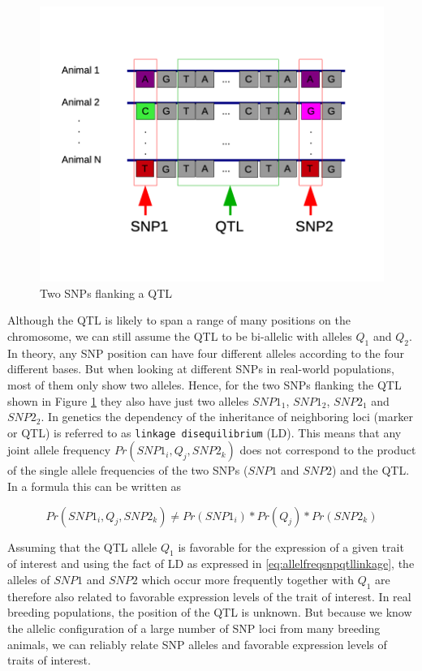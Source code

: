 \documentclass[
]{book}
\theoremstyle{definition}
\theoremstyle{definition}
\theoremstyle{definition}
\theoremstyle{remark}
\begin{document}
\begin{figure}
\includegraphics[width=12.22in]{odg/linkagesnpqtl} \caption{Two SNPs flanking a QTL}\label{fig:linkagesnpqtl}
\end{figure}

Although the QTL is likely to span a range of many positions on the chromosome, we can still assume the QTL to be bi-allelic with alleles \(Q_1\) and \(Q_2\). In theory, any SNP position can have four different alleles according to the four different bases. But when looking at different SNPs in real-world populations, most of them only show two alleles. Hence, for the two SNPs flanking the QTL shown in Figure \ref{fig:linkagesnpqtl} they also have just two alleles \(SNP1_1\), \(SNP1_2\), \(SNP2_1\) and \(SNP2_2\). In genetics the dependency of the inheritance of neighboring loci (marker or QTL) is referred to as \texttt{linkage\ disequilibrium} (LD). This means that any joint allele frequency \(Pr(SNP1_i, Q_j, SNP2_k)\) does not correspond to the product of the single allele frequencies of the two SNPs (\(SNP1\) and \(SNP2\)) and the QTL. In a formula this can be written as

\begin{equation}
 Pr(SNP1_i, Q_j, SNP2_k) \ne Pr(SNP1_i) * Pr(Q_j) * Pr(SNP2_k)
 \label{eq:allelfreqsnpqtllinkage}
\end{equation}

Assuming that the QTL allele \(Q_1\) is favorable for the expression of a given trait of interest and using the fact of LD as expressed in \eqref{eq:allelfreqsnpqtllinkage}, the alleles of \(SNP1\) and \(SNP2\) which occur more frequently together with \(Q_1\) are therefore also related to favorable expression levels of the trait of interest. In real breeding populations, the position of the QTL is unknown. But because we know the allelic configuration of a large number of SNP loci from many breeding animals, we can reliably relate SNP alleles and favorable expression levels of traits of interest.
\end{document}
